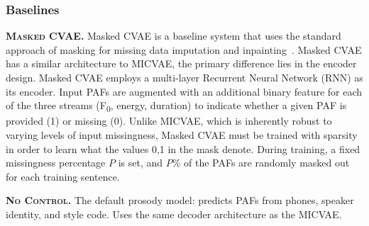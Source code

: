 \documentclass[a4paper,12pt,twoside,openright]{report}
\newcommand{\fzero}{F\textsubscript{0}}
\begin{document}



\subsubsection{Baselines}

\textbf{\textsc{Masked CVAE}.} Masked CVAE is a baseline system that uses the standard approach of masking for missing data imputation and inpainting~\parencite{Elharrouss2019ImageIA}. Masked CVAE has a similar architecture to MICVAE, the primary difference lies in the encoder design. Masked CVAE employs a multi-layer Recurrent Neural Network (RNN) as its encoder. Input PAFs are augmented with an additional binary feature for each of the three streams (\fzero, energy, duration) to indicate whether a given PAF is provided (1) or missing (0). Unlike MICVAE, which is inherently robust to varying levels of input missingness, Masked CVAE must be trained with sparsity in order to learn what the values 0,1 in the mask denote. During training, a fixed missingness percentage \( P \) is set, and \( P \% \) of the PAFs are randomly masked out for each training sentence.


\textbf{\textsc{No Control}.} The default prosody model: predicts PAFs from phones, speaker identity, and style code. Uses the same decoder architecture as the MICVAE.
\end{document}
